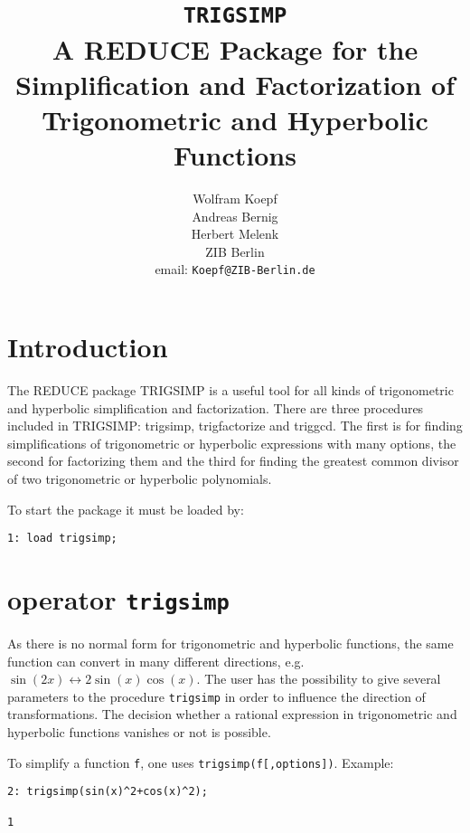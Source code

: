 \title{{\tt TRIGSIMP}\\
A REDUCE Package for the Simplification and Factorization of Trigonometric
and Hyperbolic Functions}
\date{}
\author{Wolfram Koepf\\
        Andreas Bernig\\
        Herbert Melenk\\
        ZIB Berlin \\
        email: {\tt  Koepf@ZIB-Berlin.de}}

\maketitle
\section{Introduction}

The REDUCE package TRIGSIMP is a useful tool for all kinds of trigonometric and
hyperbolic simplification and factorization. There are three
procedures included in TRIGSIMP: trigsimp, trigfactorize and triggcd. 
The first is for finding simplifications of trigonometric or 
hyperbolic expressions with many options, the second for factorizing 
them and the third 
for finding the greatest common divisor of two trigonometric or 
hyperbolic polynomials.

To start the package it must be loaded by:
{\small
\begin{verbatim}
1: load trigsimp;
\end{verbatim}
}\noindent

\section{\REDUCE{} operator {\tt trigsimp}}

As there is no normal form for trigonometric and hyperbolic functions, the same 
function can convert in many different directions, e.g. 
$\sin(2x) \leftrightarrow 2\sin(x)\cos(x)$. 
The user has the possibility to give several parameters to the 
procedure {\tt trigsimp} in order to influence the direction of transformations. 
The decision whether a rational expression in trigonometric 
and hyperbolic functions vanishes or not is possible.

To simplify a function {\tt f}, one uses {\tt trigsimp(f[,options])}. Example:
{\small
\begin{verbatim}
2: trigsimp(sin(x)^2+cos(x)^2);

1
\end{verbatim}
}\noindent

